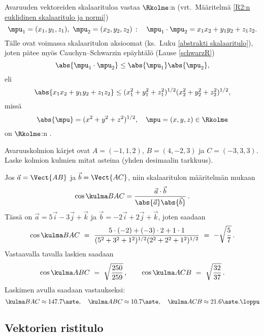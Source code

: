 Avaruuden vektoreiden skalaarituloa vastaa $\Rkolme$:n
(vrt.\ Määritelmä \ref{R2:n euklidinen skalaaritulo ja normi})
\[
\mpu_1 = (x_1,y_1,z_1), \ \mpu_2 = (x_2,y_2,z_2)\,: \quad
                                    \mpu_1 \cdot \mpu_2 = x_1x_2 + y_1y_2 + z_1z_2.
\]
Tälle ovat voimassa skalaaritulon aksioomat (ks.\ Luku \ref{abstrakti skalaaritulo}), joten
pätee myös Cauchyn--Schwarzin epäyhtälö (Lause \ref{schwarzR})
\[
\abs{\mpu_1\cdot\mpu_2} \le \abs{\mpu_1}\abs{\mpu_2},
\]
eli
\[
\abs{x_1x_2 + y_1y_2 + z_1z_2} \leq (x_1^2+y_1^2+z_1^2)^{1/2}(x_2^2+y_2^2+z_2^2)^{1/2},
\]
missä
\[
\abs{\mpu}=(x^2+y^2+z^2)^{1/2}, \quad \mpu=(x,y,z)\in\Rkolme
\]
on $\Rkolme$:n
.
\begin{Exa} Avaruuskolmion kärjet ovat $A=(-1,1,2)$, $B=(4,-2,3)$ ja $C=(-3,3,3)$. Laske kolmion
kulmien mitat asteina (yhden desimaalin tarkkuus).
\end{Exa}
\ratk Jos $\vec a=\Vect{AB}$ ja $\vec b=\Vect{AC}$, niin skalaaritulon määritelmän mukaan
\[
\cos\kulma BAC = \frac{\vec a\cdot\vec b}{\abs{\vec a}\abs{\vec b}}\,.
\]
Tässä on $\vec a=5\vec i-3\vec j+\vec k$ ja $\vec b=-2\vec i+2\vec j+\vec k$, joten saadaan
\[
\cos\kulma BAC\ 
  =\ \frac{5 \cdot (-2) + (-3) \cdot 2 +1 \cdot 1}{(5^2+3^2+1^2)^{1/2}(2^2+2^2+1^2)^{1/2}}\
  =\ -\sqrt{\frac{5}{7}}\,.
\]
Vastaavalla tavalla laskien saadaan
\[
\cos\kulma ABC\ =\ \sqrt{\frac{250}{259}}\,, \qquad
\cos\kulma ACB\ =\ \sqrt{\frac{32}{37}}\,.
\]
Laskimen avulla saadaan vastaukseksi: 
\[
\kulma BAC \approx 147.7\aste, \quad \kulma ABC \approx 10.7\aste, \quad
\kulma ACB \approx 21.6\aste. \loppu
\]

\subsection*{Vektorien ristitulo}

